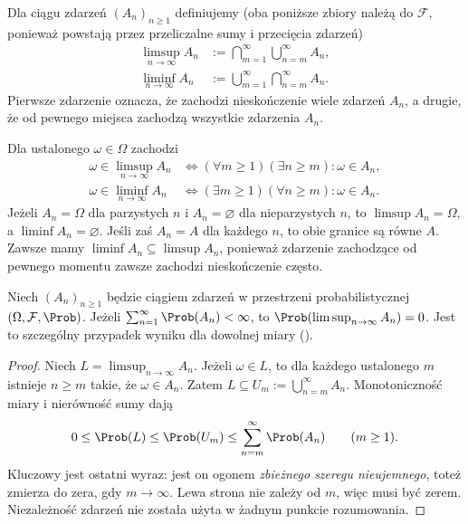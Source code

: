 \begin{definicja}
Dla ciągu zdarzeń $(A_n)_{n\geq1}$ definiujemy (oba poniższe
zbiory należą do $\mathcal F$, ponieważ powstają przez
przeliczalne sumy i przecięcia zdarzeń)
\begin{align*}
\limsup_{n\to\infty}A_n
&:=\bigcap_{m=1}^\infty\bigcup_{n=m}^\infty A_n,\\
\liminf_{n\to\infty}A_n
&:=\bigcup_{m=1}^\infty\bigcap_{n=m}^\infty A_n.
\end{align*}
Pierwsze zdarzenie oznacza, że zachodzi nieskończenie wiele zdarzeń $A_n$,
a drugie, że od pewnego miejsca zachodzą wszystkie zdarzenia $A_n$.
\end{definicja}


\begin{przyklad}
Dla ustalonego $\omega\in\Omega$ zachodzi
\begin{align*}
\omega\in\limsup_{n\to\infty}A_n
&\iff (\forall m\geq1)(\exists n\geq m):\omega\in A_n,\\
\omega\in\liminf_{n\to\infty}A_n
&\iff (\exists m\geq1)(\forall n\geq m):\omega\in A_n.
\end{align*}
Jeżeli $A_n=\Omega$ dla parzystych $n$ i $A_n=\varnothing$
dla nieparzystych $n$, to $\limsup A_n=\Omega$, a
$\liminf A_n=\varnothing$. Jeśli zaś $A_n=A$ dla każdego $n$,
to obie granice są równe $A$. Zawsze mamy
$\liminf A_n\subseteq\limsup A_n$, ponieważ zdarzenie
zachodzące od pewnego momentu zawsze zachodzi nieskończenie często.
\end{przyklad}

\begin{twierdzenie}
Niech $(A_n)_{n\geq1}$ będzie ciągiem zdarzeń w przestrzeni
probabilistycznej $(\Omega,\mathcal F,\Prob)$.
Jeżeli $\sum_{n=1}^\infty\Prob(A_n)<\infty$, to
$\Prob(\limsup_{n\to\infty}A_n)=0$.
Jest to szczególny przypadek wyniku dla dowolnej miary
().
\end{twierdzenie}
\begin{proof}
Niech $L=\limsup_{n\to\infty}A_n$.
Jeżeli $\omega\in L$, to dla każdego ustalonego $m$
istnieje $n\geq m$ takie, że $\omega\in A_n$.
Zatem $L\subseteq U_m:=\bigcup_{n=m}^\infty A_n$.
Monotoniczność miary i nierówność sumy dają
\[
0\leq\Prob(L)\leq\Prob(U_m)
\leq\sum_{n=m}^\infty\Prob(A_n)
\qquad(m\geq1).
\]
Kluczowy jest ostatni wyraz: jest on ogonem 
\emph{zbieżnego szeregu nieujemnego}, toteż zmierza
do zera, gdy $m\to\infty$. Lewa strona nie zależy od $m$,
więc musi być zerem. Niezależność zdarzeń nie została
użyta w żadnym punkcie rozumowania.
\end{proof}


